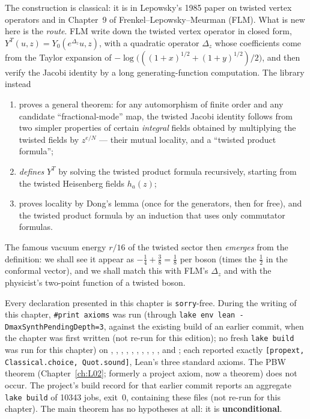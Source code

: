 The construction is classical: it is in Lepowsky's 1985 paper on twisted vertex operators and
in Chapter~9 of Frenkel--Lepowsky--Meurman (FLM). What is new here is the \emph{route}. FLM
write down the twisted vertex operator in closed form, $Y^T(u,z) = Y_0(e^{\Delta_z}u, z)$, with
a quadratic operator $\Delta_z$ whose coefficients come from the Taylor expansion of
$-\log\bigl(((1+x)^{1/2}+(1+y)^{1/2})/2\bigr)$, and then verify the Jacobi identity by a long
generating-function computation. The library instead
\begin{enumerate}[label=(\arabic*)]
  \item proves a general theorem: for any automorphism of finite order and any candidate
  ``fractional-mode'' map, the twisted Jacobi identity follows from two simpler properties of
  certain \emph{integral} fields obtained by multiplying the twisted fields by $z^{e/N}$ ---
  their mutual locality, and a ``twisted product formula'';
  \item \emph{defines} $Y^T$ by solving the twisted product formula recursively, starting from
  the twisted Heisenberg fields $h_a(z)$;
  \item proves locality by Dong's lemma (once for the generators, then for free), and the
  twisted product formula by an induction that uses only commutator formulas.
\end{enumerate}
The famous vacuum energy $r/16$ of the twisted sector then \emph{emerges} from the definition:
we shall see it appear as $-\tfrac14+\tfrac38 = \tfrac18$ per boson (times the $\tfrac12$ in the
conformal vector), and we shall match this with FLM's $\Delta_z$ and with the physicist's
two-point function of a twisted boson.

\begin{status}
Every declaration presented in this chapter is \texttt{sorry}-free. During the writing of this
chapter, \verb|#print axioms| was run (through \verb|lake env lean -DmaxSynthPendingDepth=3|,
against the existing build of an earlier commit, when the chapter was first written (not re-run for this edition); no fresh \verb|lake build| was run for
this chapter) on , , ,
, , , ,
, , ,
 and ; each reported exactly
\texttt{[propext, Classical.choice, Quot.sound]}, Lean's three standard axioms. The PBW theorem  (Chapter~\ref{ch:L02}; formerly a project axiom, now a theorem) does not occur. The project's build record for that earlier commit reports an
aggregate \verb|lake build| of 10343 jobs, exit~0, containing these files (not re-run for this chapter). The main theorem
 has no hypotheses at all: it is \textbf{unconditional}.
\end{status}


